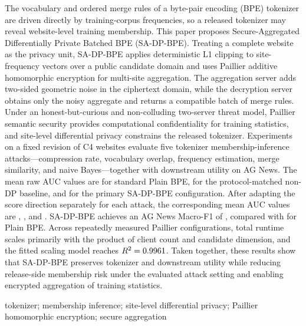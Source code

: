 \begin{eabstract}
The vocabulary and ordered merge rules of a byte-pair encoding (BPE) tokenizer are driven directly by training-corpus frequencies, so a released tokenizer may reveal website-level training membership. This paper proposes Secure-Aggregated Differentially Private Batched BPE (SA-DP-BPE). Treating a complete website as the privacy unit, SA-DP-BPE applies deterministic L1 clipping to site-frequency vectors over a public candidate domain and uses Paillier additive homomorphic encryption for multi-site aggregation. The aggregation server adds two-sided geometric noise in the ciphertext domain, while the decryption server obtains only the noisy aggregate and returns a compatible batch of merge rules. Under an honest-but-curious and non-colluding two-server threat model, Paillier semantic security provides computational confidentiality for training statistics, and site-level differential privacy constrains the released tokenizer. Experiments on a fixed revision of C4 websites evaluate five tokenizer membership-inference attacks---compression rate, vocabulary overlap, frequency estimation, merge similarity, and naive Bayes---together with downstream utility on AG News. The mean raw AUC values are \PlainMeanAttackAUC{} for standard Plain BPE, \HEMeanAttackAUC{} for the protocol-matched non-DP baseline, and \PrimaryMeanAttackAUC{} for the primary SA-DP-BPE configuration. After adapting the score direction separately for each attack, the corresponding mean AUC values are \PlainAdaptedAUC, \ProtocolBaselineAdaptedAUC, and \PrimaryAdaptedAUC. SA-DP-BPE achieves an AG News Macro-F1 of \PrimaryMacroFOne, compared with \PlainMacroFOne{} for Plain BPE. Across \MeasuredCryptoCells{} repeatedly measured Paillier configurations, total runtime scales primarily with the product of client count and candidate dimension, and the fitted scaling model reaches $R^2=0.9961$. Taken together, these results show that SA-DP-BPE preserves tokenizer and downstream utility while reducing release-side membership risk under the evaluated attack setting and enabling encrypted aggregation of training statistics.
\end{eabstract}

\begin{ekeywords}
tokenizer; membership inference; site-level differential privacy; Paillier homomorphic encryption; secure aggregation
\end{ekeywords}
